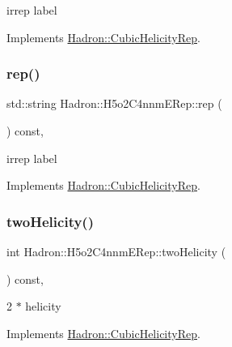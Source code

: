 irrep label 

Implements \mbox{\hyperlink{structHadron_1_1CubicHelicityRep_a8cdd86f068a167dc96faef02bfb8a33d}{Hadron\+::\+Cubic\+Helicity\+Rep}}.

\mbox{\label{structHadron_1_1H5o2C4nnmERep_abf60b976264ddcc15c9d98b220092085}} 
\subsubsection{\texorpdfstring{rep()}{rep()}\hspace{0.1cm}{\footnotesize\ttfamily [3/3]}}
{\footnotesize\ttfamily std\+::string Hadron\+::\+H5o2\+C4nnm\+E\+Rep\+::rep (\begin{DoxyParamCaption}{ }\end{DoxyParamCaption}) const\hspace{0.3cm}{\ttfamily [inline]}, {\ttfamily [virtual]}}

irrep label 

Implements \mbox{\hyperlink{structHadron_1_1CubicHelicityRep_a8cdd86f068a167dc96faef02bfb8a33d}{Hadron\+::\+Cubic\+Helicity\+Rep}}.

\mbox{\label{structHadron_1_1H5o2C4nnmERep_a5b15b3ef270c38266d305dfec412684d}} 
\subsubsection{\texorpdfstring{twoHelicity()}{twoHelicity()}\hspace{0.1cm}{\footnotesize\ttfamily [1/3]}}
{\footnotesize\ttfamily int Hadron\+::\+H5o2\+C4nnm\+E\+Rep\+::two\+Helicity (\begin{DoxyParamCaption}{ }\end{DoxyParamCaption}) const\hspace{0.3cm}{\ttfamily [inline]}, {\ttfamily [virtual]}}

2 $\ast$ helicity 

Implements \mbox{\hyperlink{structHadron_1_1CubicHelicityRep_af507aa56fc2747eacc8cb6c96db31ecc}{Hadron\+::\+Cubic\+Helicity\+Rep}}.

\mbox{\label{structHadron_1_1H5o2C4nnmERep_a5b15b3ef270c38266d305dfec412684d}} 
